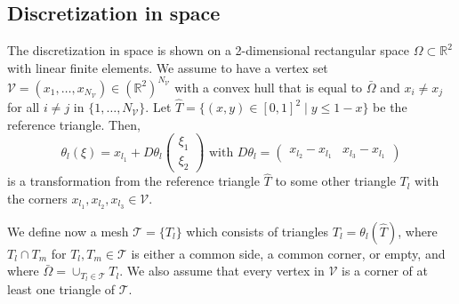 \subsection{\label{SubsectionDiscretizationInSpace}Discretization in space}
The discretization in space is shown on a 2-dimensional rectangular space $\Omega\subset\mathbb{R}^2$ with linear finite elements. We assume to have a vertex set $\mathcal{V}=(x_1,\dotsc,x_{N_\mathcal{V}})\in(\mathbb{R}^2)^{N_\mathcal{V}}$ with a convex hull that is equal  to $\bar{\Omega}$ and $x_i\neq x_j$ for all $i\neq j$ in $\{1,\dotsc,N_\mathcal{V}\}$. Let $\hat{T}=\{(x,y)\in[0,1]^2\mid y \leq 1-x\}$ be the reference triangle. Then,
\begin{displaymath}
\theta_l(\xi)=x_{l_1} + D\theta_l \begin{pmatrix} \xi_1 \\ \xi_2 \end{pmatrix} \text{ with } D\theta_l = \begin{pmatrix} x_{l_2}-x_{l_1} & x_{l_3}-x_{l_1} \end{pmatrix}
\end{displaymath}
is a transformation from the reference triangle $\hat{T}$ to some other triangle $T_l$ with the corners $x_{l_1}, x_{l_2}, x_{l_3}\in\mathcal{V}$.

We define now a mesh $\mathcal{T}=\{T_l\}$ which consists of triangles $T_l=\theta_l(\hat{T})$, where $T_l\cap T_m$ for $T_l,T_m\in\mathcal{T}$ is either a common side, a common corner, or empty, and where $\bar{\Omega}=\cup_{T_l\in\mathcal{T}}T_l$. We also assume that every vertex in $\mathcal{V}$ is a corner of at least one triangle of $\mathcal{T}$.\\

